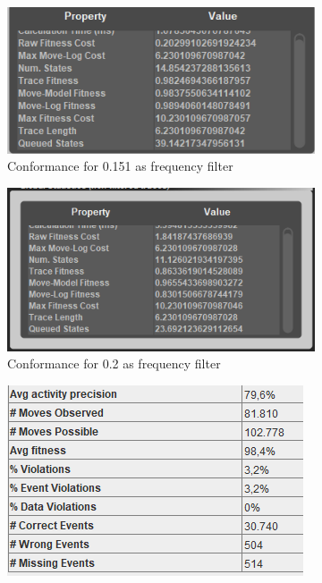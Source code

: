 \begin{figure}[!htbp]
\centering
\begin{subfigure}{.4\textwidth}
  \centering
  \includegraphics[width=\linewidth]{P_Conformance0-151.PNG}
  \caption{Conformance for 0.151 as frequency filter}
  \label{fig:P_Conf0-151}
\end{subfigure}%
\begin{subfigure}{.4\textwidth}
  \centering
  \includegraphics[width=\linewidth]{P_Conformance0-2.PNG}
  \caption{Conformance for 0.2 as frequency filter}
  \label{fig:P_Conf0-2}
\end{subfigure}
\begin{subfigure}{.4\textwidth}
  \centering
  \includegraphics[width=\linewidth]{P_Precision0-151.PNG}

\end{subfigure}
\end{figure}
